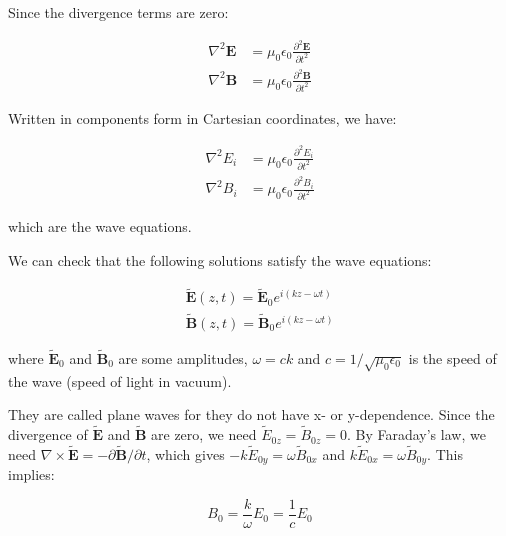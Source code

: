 \documentclass[12pt]{article}
\begin{document}
Since the divergence terms are zero:

\begin{equation}
\begin{split}
    \nabla^{2} \mathbf{E} &= \mu_{0} \epsilon_{0} \frac{\partial^{2} \mathbf{E}}{\partial t^{2}} \\
    \nabla^{2} \mathbf{B} &= \mu_{0} \epsilon_{0} \frac{\partial^{2} \mathbf{B}}{\partial t^{2}}
\end{split}
\end{equation}

Written in components form in Cartesian coordinates, we have:

\begin{equation}
\begin{split}
    \nabla^{2} E_{i} &= \mu_{0} \epsilon_{0} \frac{\partial^{2} E_{i}}{\partial t^{2}} \\
    \nabla^{2} B_{i} &= \mu_{0} \epsilon_{0} \frac{\partial^{2} B_{i}}{\partial t^{2}}
\end{split}
\end{equation}

which are the wave equations.

We can check that the following solutions satisfy the wave equations:

\begin{equation}
\begin{split}
    \tilde{\mathbf{E}}(z, t) = \tilde{\mathbf{E}}_{0} e^{i(kz - \omega t)} \\
    \tilde{\mathbf{B}}(z, t) = \tilde{\mathbf{B}}_{0} e^{i(kz - \omega t)}
\end{split}
\end{equation}

where $\tilde{\mathbf{E}}_{0}$ and $\tilde{\mathbf{B}}_{0}$ are some amplitudes, $\omega = ck$ and $c = 1/\sqrt{\mu_{0} \epsilon_{0}}$ is the speed of the wave (speed of light in vacuum).

They are called plane waves for they do not have x- or y-dependence. Since the divergence of $\tilde{\mathbf{E}}$ and $\tilde{\mathbf{B}}$ are zero, we need $\tilde{E}_{0z} = \tilde{B}_{0z} = 0$. By Faraday's law, we need $\nabla \times \tilde{\mathbf{E}} = -\partial \tilde{\mathbf{B}}/\partial t$, which gives $-k \tilde{E}_{0y} = \omega \tilde{B}_{0x}$ and $k \tilde{E}_{0x} = \omega \tilde{B}_{0y}$. This implies:

\begin{equation}
    B_{0} = \frac{k}{\omega} E_{0} = \frac{1}{c} E_{0}
\end{equation}
\end{document}
